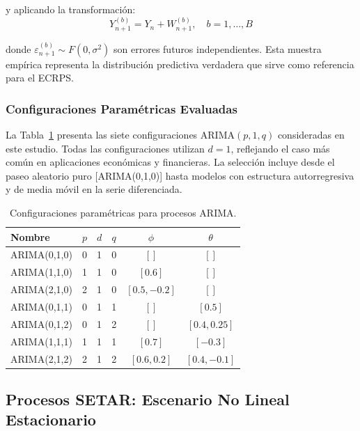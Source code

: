 y aplicando la transformación:
\begin{equation}
Y_{n+1}^{(b)} = Y_n + W_{n+1}^{(b)}, \quad b = 1, \ldots, B
\label{eq:arima_level_samples}
\end{equation}

donde $\varepsilon_{n+1}^{(b)} \sim F(0, \sigma^2)$ son errores futuros independientes. Esta muestra empírica representa la distribución predictiva verdadera que sirve como referencia para el ECRPS.

\subsubsection{Configuraciones Paramétricas Evaluadas}

La Tabla~\ref{tab:arima_configs} presenta las siete configuraciones ARIMA$(p,1,q)$ consideradas en este estudio. Todas las configuraciones utilizan $d=1$, reflejando el caso más común en aplicaciones económicas y financieras. La selección incluye desde el paseo aleatorio puro [ARIMA(0,1,0)] hasta modelos con estructura autorregresiva y de media móvil en la serie diferenciada.

\begin{table}[htbp]
\centering
\caption{Configuraciones paramétricas para procesos ARIMA.}
\label{tab:arima_configs}
\renewcommand{\arraystretch}{1.2}
\begin{tabular}{lccccc}
\toprule
\textbf{Nombre} & \boldmath$p$ & \boldmath$d$ & \boldmath$q$ & \boldmath$\phi$ & \boldmath$\theta$ \\
\midrule
ARIMA(0,1,0) & 0 & 1 & 0 & $[]$              & $[]$              \\
ARIMA(1,1,0) & 1 & 1 & 0 & $[0.6]$           & $[]$              \\
ARIMA(2,1,0) & 2 & 1 & 0 & $[0.5, -0.2]$     & $[]$              \\
ARIMA(0,1,1) & 0 & 1 & 1 & $[]$              & $[0.5]$           \\
ARIMA(0,1,2) & 0 & 1 & 2 & $[]$              & $[0.4, 0.25]$     \\
ARIMA(1,1,1) & 1 & 1 & 1 & $[0.7]$           & $[-0.3]$          \\
ARIMA(2,1,2) & 2 & 1 & 2 & $[0.6, 0.2]$      & $[0.4, -0.1]$     \\
\bottomrule
\end{tabular}
\end{table}

\subsection{Procesos SETAR: Escenario No Lineal Estacionario}
\label{subsec:setar}

